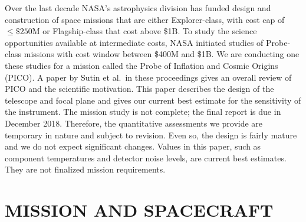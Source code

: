 \documentclass[]{spie}  %
\begin{document}
Over the last decade NASA's astrophysics division has funded design and construction of space missions that are either Explorer-class, 
with cost cap of $\leq \$250$M or Flagship-class that cost above \$1B. 
To study the science opportunities available at intermediate costs, NASA initiated studies of Probe-class missions with cost window 
between \$400M and \$1B.  We are conducting one these studies for a mission called the Probe of Inflation and Cosmic Origins (PICO). 
A paper by Sutin et al.\cite{brian_spie}\ in these proceedings gives an overall review of PICO and the scientific motivation.  
This paper describes the design of the telescope and focal plane and gives 
our current best estimate for the sensitivity of the instrument. The mission study is not complete; the final report 
is due in December 2018. Therefore, the quantitative assessments we provide are temporary in nature and subject to revision. 
Even so, the design is fairly mature and we do not expect significant changes. 
Values in this paper, such as component temperatures and detector noise levels,  
are current best estimates. They are not finalized mission requirements. 


\section{MISSION AND SPACECRAFT}
\label{sec:spacecraft}
\end{document}
